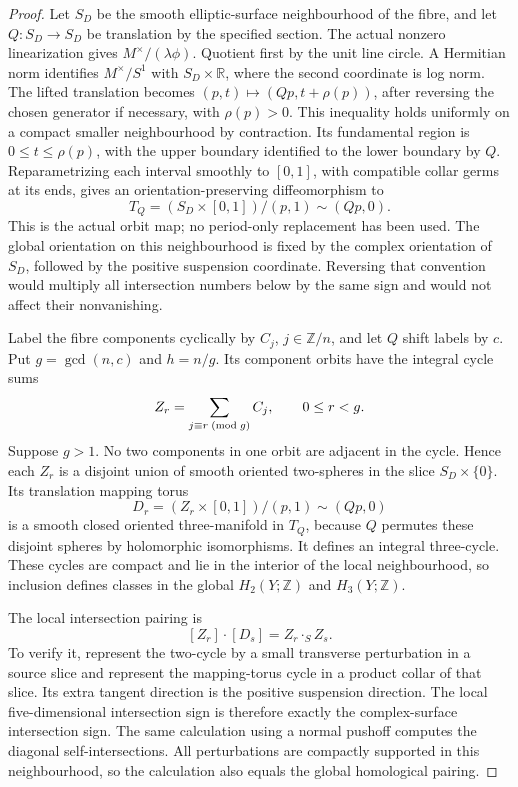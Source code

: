 \begin{proof}
Let \(S_D\) be the smooth elliptic-surface
neighbourhood of the fibre, and let \(Q:S_D\to S_D\) be
translation by the specified section.  The actual nonzero
linearization gives \(M^\times/(\lambda\phi)\).  Quotient
first by the unit line circle.  A Hermitian norm identifies
\(M^\times/S^1\) with \(S_D\times\mathbb R\), where
the second coordinate is log norm.  The lifted translation becomes
\((p,t)\mapsto(Qp,t+\rho(p))\), after reversing the chosen
generator if necessary, with \(\rho(p)>0\).  This inequality
holds uniformly on a compact smaller neighbourhood by contraction.
Its fundamental region is
\(0\le t\le\rho(p)\), with the upper boundary identified to
the lower boundary by \(Q\).  Reparametrizing each interval
smoothly to \([0,1]\), with compatible collar germs at its
ends, gives an orientation-preserving diffeomorphism to
\[
 T_Q=(S_D\times[0,1])/(p,1)\sim(Qp,0).
\]
This is the actual orbit map; no period-only replacement has been
used.  The global orientation on this neighbourhood is fixed by
the complex orientation of \(S_D\), followed by the positive
suspension coordinate.  Reversing that convention would multiply
all intersection numbers below by the same sign and would not
affect their nonvanishing.

Label the fibre components cyclically by \(C_j\),
\(j\in\mathbb Z/n\), and let \(Q\) shift labels by
\(c\).  Put \(g=\gcd(n,c)\) and \(h=n/g\).  Its
component orbits have the integral cycle sums
\[
 Z_r=\sum_{j\equiv r\;({\rm mod}\;g)}C_j,
 \qquad 0\le r<g.
\]
Suppose \(g>1\).  No two components in one orbit are adjacent
in the cycle.  Hence each \(Z_r\) is a disjoint union of smooth
oriented two-spheres in the slice \(S_D\times\{0\}\).
Its translation mapping torus
\[
 D_r=(Z_r\times[0,1])/(p,1)\sim(Qp,0)
\]
is a smooth closed oriented three-manifold in \(T_Q\),
because \(Q\) permutes these disjoint spheres by holomorphic
isomorphisms.  It defines an integral three-cycle.  These cycles
are compact and lie in the interior of the local
neighbourhood, so inclusion defines classes in the global
\(H_2(Y;\mathbb Z)\) and \(H_3(Y;\mathbb Z)\).

The local intersection pairing is
\[
                    [Z_r]\cdot[D_s]=Z_r\cdot_S Z_s.
\]
To verify it, represent the two-cycle by a small transverse
perturbation in a source slice and represent the mapping-torus
cycle in a product collar of that slice.  Its extra tangent
direction is the positive suspension direction.  The local
five-dimensional intersection sign is therefore exactly the
complex-surface intersection sign.  The same calculation using
a normal pushoff computes the diagonal self-intersections.
All perturbations are compactly supported in this neighbourhood,
so the calculation also equals the global homological pairing.


\end{proof}
